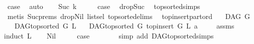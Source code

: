 \begin{isabellebody}
\ {\isacharquery}{\kern0pt}case\ \isamarkupfalse%
\ auto\isanewline
{}\isamarkupfalse%
\isanewline
\ \ \isamarkupfalse%
\ {\isacharparenleft}{\kern0pt}Suc\ k{\isacharparenright}{\kern0pt}\isanewline
\ \ \isamarkupfalse%
\ \isamarkupfalse%
\ {\isacharquery}{\kern0pt}case\ \isamarkupfalse%
\ drop{\isacharunderscore}{\kern0pt}Suc\ \isamarkupfalse%
\ top{\isacharunderscore}{\kern0pt}sorted{\isachardot}{\kern0pt}simps\isanewline
\ \ \ \ \isamarkupfalse%
\ {\isacharparenleft}{\kern0pt}metis\ Suc{\isachardot}{\kern0pt}prems{\isacharparenleft}{\kern0pt}{}{\isacharparenright}{\kern0pt}\ drop{\isacharunderscore}{\kern0pt}Nil\ list{\isachardot}{\kern0pt}sel{\isacharparenleft}{\kern0pt}{}{\isacharparenright}{\kern0pt}\ top{\isacharunderscore}{\kern0pt}sorted{\isachardot}{\kern0pt}elims{\isacharparenleft}{\kern0pt}{}{\isacharparenright}{\kern0pt}{\isacharparenright}{\kern0pt}\ \isanewline
{}\isamarkupfalse%
%
\endisatagproof
{\isafoldproof}%
%
\isadelimproof
\isanewline
%
\endisadelimproof
\isanewline
\isanewline
{}\isamarkupfalse%
\ top{\isacharunderscore}{\kern0pt}insert{\isacharunderscore}{\kern0pt}part{\isacharunderscore}{\kern0pt}ord{\isacharcolon}{\kern0pt}\isanewline
\ \ \ {\isachardoublequoteopen}DAG\ G{\isachardoublequoteclose}\isanewline
\ \ \ {\isachardoublequoteopen}DAG{\isachardot}{\kern0pt}top{\isacharunderscore}{\kern0pt}sorted\ G\ L{\isachardoublequoteclose}\isanewline
\ \ \ {\isachardoublequoteopen}DAG{\isachardot}{\kern0pt}top{\isacharunderscore}{\kern0pt}sorted\ G\ {\isacharparenleft}{\kern0pt}top{\isacharunderscore}{\kern0pt}insert\ G\ L\ a{\isacharparenright}{\kern0pt}{\isachardoublequoteclose}\ \isanewline
%
\isadelimproof
\ \ %
\endisadelimproof
%
\isatagproof
{}\isamarkupfalse%
\ assms\ \isanewline
{}\isamarkupfalse%
{\isacharparenleft}{\kern0pt}induct\ L{\isacharparenright}{\kern0pt}\isanewline
\ \ \isamarkupfalse%
\ Nil\isanewline
\ \ \isamarkupfalse%
\ \isamarkupfalse%
\ {\isacharquery}{\kern0pt}case\ \ \isanewline
\ \ \ \ \isamarkupfalse%
\ {\isacharparenleft}{\kern0pt}simp\ add{\isacharcolon}{\kern0pt}\ DAG{\isachardot}{\kern0pt}top{\isacharunderscore}{\kern0pt}sorted{\isachardot}{\kern0pt}simps{\isacharparenright}{\kern0pt}\ \ \isanewline
{}\isamarkupfalse%
\isanewline
\ \ \isamarkupfalse%

\end{isabellebody}
